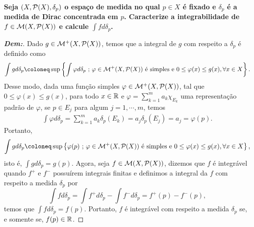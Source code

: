 \biglinend 
\newpage
{}
\myexe{\thetres}
\bigline
\textbf{Seja $(X, \mathcal P (X), \delta_p)$ o espaço de medida no 
qual $p \in X$ é fixado e $\delta_p$ é a medida de Dirac concentrada em $p$. 
Caracterize a integrabilidade de $f \in \mathcal M(X, \mathcal P(X))$ 
e calcule $\int f d\delta_p$.}
\begin{proof}[\textbf{Dem:}] Dado $g \in \mathcal M^+(X, \mathcal P(X))$, temos que 
  a integral de $g$ com respeito a $\delta_p$ é definido como 
\begin{align*}
  \int g d\delta_p \coloneq \sup \set{\int 
  \varphi d\delta_p \st \varphi \in \mathcal M^+(X, \mcal P(X))
  \text{ é simples e } 0 \le \varphi(x) \le g(x), \forall x\in X}.
\end{align*}
Desse modo, dada uma função simples $\varphi \in \mathcal M^+(X, \mathcal P(X))$, 
  tal que $0 \le \varphi(x) \le g(x)$, para todo $x \in \mathbb R$ 
  e $\varphi = \sum_{k=1}^m a_k \chi_{E_k}$ uma representação padrão de $\varphi$,
  se $p \in E_j$ para algum $j = 1, \cdots, m$, temos
\begin{align*}
  \int \varphi d\delta_p = \sum_{k=1}^m a_k \delta_p(E_k) 
  = a_j \delta_p(E_j) = a_j = \varphi(p).
\end{align*}
Portanto, 
\begin{align*}
  \int g d\delta_p \coloneq \sup \set{\varphi(p) \st \varphi \in \mathcal M^+(X, \mcal P(X))
  \text{ é simples e } 0 \le \varphi(x) \le g(x), \forall x\in X}, 
\end{align*}
  isto é, $\int g d\delta_p = g(p)$. 
  Agora, seja $f \in \mathcal M(X, \mathcal P(X))$, dizemos que $f$ 
  é integrável quando $f^+$ e $f^-$ possuírem integrais finitas e definimos a integral 
  da $f$ com respeito a medida $\delta_p$ por 
  $$\int f d\delta_p = \int f^+d\delta_p - \int f^- d\delta_p = f^+(p) - f^-(p),$$
  temos que $\int f d\delta_p = f(p)$. Portanto, $f$ é integrável com 
  respeito a medida $\delta_p$ se, e somente se, $f(p) \in \mathbb R$.
\end{proof}


